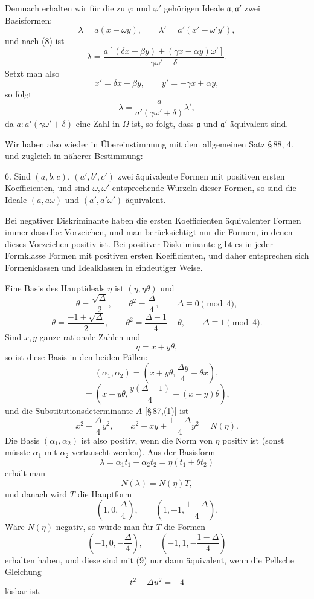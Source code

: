 \documentclass[11pt]{article}
\begin{document}
Demnach erhalten wir für die zu $\varphi$ und $\varphi'$ gehörigen Ideale $\mathfrak a,\mathfrak a'$ zwei Basisformen:
\[
 \lambda=a(x-\omega y),
 \qquad
 \lambda'=a'(x'-\omega' y'),
\]
und nach (8) ist
\[
 \lambda=\frac{a[(\delta x-\beta y)+(\gamma x-\alpha y)\omega']}{\gamma\omega'+\delta}.
\]
Setzt man also
\[
 x'=\delta x-\beta y,\qquad y'=-\gamma x+\alpha y,
\]
so folgt
\[
 \lambda=\frac{a}{a'(\gamma\omega'+\delta)}\lambda',
\]
da $a:a'(\gamma\omega'+\delta)$ eine Zahl in $\Omega$ ist, so folgt, dass $\mathfrak a$ und $\mathfrak a'$ äquivalent sind.

Wir haben also wieder in Übereinstimmung mit dem allgemeinen Satz \S\,88, 4. und zugleich in näherer Bestimmung:

6. Sind $(a,b,c)$, $(a',b',c')$ zwei äquivalente Formen mit positiven ersten Koefficienten, und sind $\omega,\omega'$ entsprechende Wurzeln dieser Formen, so sind die Ideale $(a,a\omega)$ und $(a',a'\omega')$ äquivalent.

Bei negativer Diskriminante haben die ersten Koefficienten äquivalenter Formen immer dasselbe Vorzeichen, und man berücksichtigt nur die Formen, in denen dieses Vorzeichen positiv ist. Bei positiver Diskriminante gibt es in jeder Formklasse Formen mit positiven ersten Koefficienten, und daher entsprechen sich Formenklassen und Idealklassen in eindeutiger Weise.

Eine Basis des Hauptideals $\eta$ ist $(\eta,\eta\theta)$ und
\[
 \theta=\frac{\sqrt\Delta}{2},\qquad \theta^2=\frac{\Delta}{4},\qquad \Delta\equiv0\pmod4,
\]
\[
 \theta=\frac{-1+\sqrt\Delta}{2},\qquad \theta^2=\frac{\Delta-1}{4}-\theta,
 \qquad \Delta\equiv1\pmod4.
\]
Sind $x,y$ ganze rationale Zahlen und
\[
 \eta=x+y\theta,
\]
so ist diese Basis in den beiden Fällen:
\[
 (\alpha_1,\alpha_2)=\left(x+y\theta,\frac{\Delta y}{4}+\theta x\right),
\]
\[
 =\left(x+y\theta,\frac{y(\Delta-1)}{4}+(x-y)\theta\right),
\]
und die Substitutionsdeterminante $A$ [\S\,87,(1)] ist
\[
 x^2-\frac{\Delta}{4}y^2,
 \qquad
 x^2-xy+\frac{1-\Delta}{4}y^2=N(\eta).
\]
Die Basis $(\alpha_1,\alpha_2)$ ist also positiv, wenn die Norm von $\eta$ positiv ist (sonst müsste $\alpha_1$ mit $\alpha_2$ vertauscht werden). Aus der Basisform
\[
 \lambda=\alpha_1t_1+\alpha_2t_2=\eta(t_1+\theta t_2)
\]
erhält man
\[
 N(\lambda)=N(\eta)T,
\]
und danach wird $T$ die Hauptform
\begin{equation}
 \left(1,0,\frac{\Delta}{4}\right),\qquad
 \left(1,-1,\frac{1-\Delta}{4}\right).
\tag{9}
\end{equation}
Wäre $N(\eta)$ negativ, so würde man für $T$ die Formen
\[
 \left(-1,0,-\frac{\Delta}{4}\right),\qquad
 \left(-1,1,-\frac{1-\Delta}{4}\right)
\]
erhalten haben, und diese sind mit (9) nur dann äquivalent, wenn die Pellsche Gleichung
\[
 t^2-\Delta u^2=-4
\]
lösbar ist.
\end{document}
